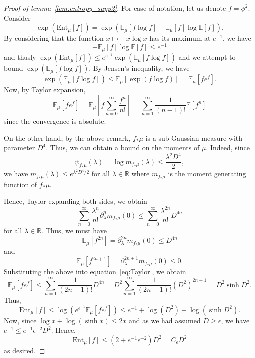 \begin{proof}[Proof of lemma~\ref{lem:entropy_supp2}]
  For ease of notation, let us denote \(f = \phi^2\). Consider 
  \[\exp(\text{Ent}_\mu[f]) = \exp(\mathbb{E}_\mu[f\log f] - \mathbb{E}_\mu[f]\log\mathbb{E}[f]).\]
  By considering that the function \(x \mapsto -x\log x\) has its maximum at \(e^{-1}\), we have
  \[- \mathbb{E}_\mu[f]\log\mathbb{E}[f] \le e^{-1}\]
  and thusly \(\exp(\text{Ent}_\mu[f]) \le e^{e^{-1}}\exp(\mathbb{E}_\mu[f\log f])\) and 
  we attempt to bound \(\exp(\mathbb{E}_\mu[f\log f])\). By Jensen's inequality, we have 
  \[\exp(\mathbb{E}_\mu[f\log f]) \le \mathbb{E}_\mu[\exp(f\log f)] = \mathbb{E}_\mu[f e^f].\]
  Now, by Taylor expansion,
  \begin{equation}\label{eq:Taylor}
    \mathbb{E}_\mu[f e^f] = \mathbb{E}_\mu\left[f \sum_{n = 0}^\infty \frac{f^n}{n!}\right]
      = \sum_{n = 1}^\infty \frac{1}{(n - 1)!} \mathbb{E}[f^n]
  \end{equation}
  since the convergence is absolute. 

  On the other hand, by the above remark, \(f_* \mu\) is a sub-Gaussian measure with parameter \(D^4\).
  Thus, we can obtain a bound on the moments of \(\mu\). Indeed, since
  \[\psi_{f_*\mu}(\lambda) = \log m_{f_*\mu}(\lambda) \le \frac{\lambda^2 D^4}{2},\]
  we have \(m_{f_*\mu}(\lambda) \le e^{\lambda^2 D^4 / 2}\) for all \(\lambda \in \mathbb{R}\)
  where \(m_{f_*\mu}\) is the moment generating function of \(f_* \mu\).  

  Hence, Taylor expanding both sides, we obtain
  \[\sum_{n = 0}^\infty \frac{\lambda^n}{n!}\partial_\lambda^n m_{f_*\mu}(0) \le \sum_{n = 0}^\infty \frac{\lambda^{2n}}{n!}D^{4n}\]
  for all \(\lambda \in \mathbb{R}\). Thus, we must have 
  \[\mathbb{E}_\mu[f^{2n}] = \partial_\lambda^{2n} m_{f_*\mu}(0) \le D^{4n}\]
  and 
  \[\mathbb{E}_\mu[f^{2n + 1}] = \partial_\lambda^{2n + 1} m_{f_*\mu}(0) \le 0.\]
  Substituting the above into equation~\eqref{eq:Taylor}, we obtain
  \[\mathbb{E}_\mu[fe^f] \le \sum_{n = 1}^\infty \frac{1}{(2n - 1)!}D^{4n}
      = D^2 \sum_{n = 1}^\infty \frac{1}{(2n - 1)!}(D^2)^{2n - 1}
      = D^2 \sinh D^2.\]
  Thus, 
  \[\text{Ent}_\mu[f] \le \log(e^{e^{-1}}\mathbb{E}_\mu[fe^f])
    \le e^{-1} + \log(D^2) + \log (\sinh D^2).\]
  Now, since \(\log x + \log (\sinh x) \le 2x\) and as we had assumed \(D \ge \epsilon\), we have 
  \(e^{-1} \le e^{-1}\epsilon^{-2} D^2\). Hence,
  \[\text{Ent}_\mu[f] \le (2 + e^{-1}\epsilon^{-2})D^2 = C_\epsilon D^2\]
  as desired.
\end{proof}

